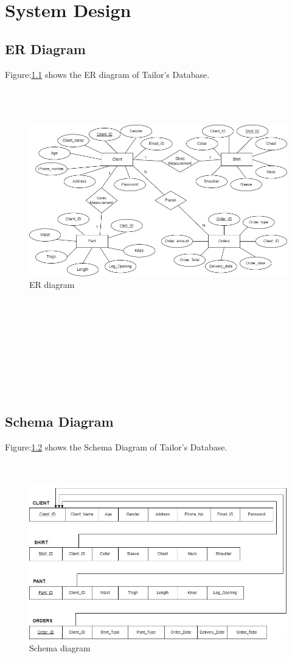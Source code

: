 \documentclass[12pt, letter paper]{report}
\begin{document}
{\chapter{System Design}
\section{ER Diagram} 
Figure:\ref{fig:tailor_database.jpg} shows the ER diagram of Tailor's Database.
\\
\\
\\
\\
\begin{figure}[h]
 \centering
 \includegraphics[width=1\textwidth]{tailor_database.jpg}
 \caption{ER diagram}
 \label{fig:tailor_database.jpg}
\end{figure}
\\
\\
\\
\\
\\
\\
\\
\\
\section{Schema Diagram} 
Figure:\ref{fig:tailor_schema(1).jpg} shows the Schema Diagram of Tailor's Database.
\\
\\
\\
\begin{figure}[h]
 \centering
 \includegraphics[width=1\textwidth]{tailor_schema (1).jpg}
 \caption{Schema diagram}
 \label{fig:tailor_schema(1).jpg}
\end{figure}
}
\end{document}
